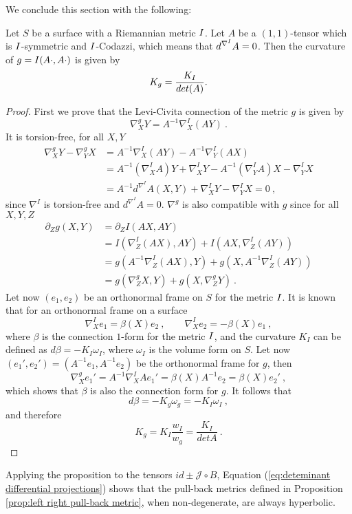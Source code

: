 We conclude this section with the following:

\begin{proposition} \label{prop:Gaussian curvature}
    Let $S$ be a surface with a Riemannian metric $I$. Let $A$ be a $(1,1)$-tensor which is $I$-symmetric and $I$-Codazzi, which means that $d^{\nabla^{I}} A=0$. Then the curvature of $g= I(A \cdot, A \cdot)$ is given by
    \[
        K_g = \frac{K_I}{det(A)}.
    \]
\end{proposition}
\begin{proof}
    First we prove that the Levi-Civita connection of the metric $g$ is given by
    \[
        \nabla^g_X Y = A^{-1} \nabla^I_X(AY) \ .
    \]
    It is torsion-free, for all $X,Y$
    \[
    \begin{split}
        \nabla^g_X Y - \nabla^g_Y X & =  A^{-1} \nabla^I_X(AY) - A^{-1} \nabla^I_Y(AX) \\
        & = A^{-1} (\nabla^I_XA)Y + \nabla^I_X Y - A^{-1} (\nabla^I_YA)X - \nabla^I_Y X  \\
        & = A^{-1} d^{\nabla^I}A(X,Y) +  \nabla^I_X Y - \nabla^I_Y X = 0 \ ,
    \end{split}
    \]
    since $\nabla^I$ is torsion-free and $d^{\nabla^I}A = 0$. $\nabla^g$ is also compatible with $g$ since for all $X,Y,Z$
    \[
    \begin{split}
        \partial_Z g(X,Y) & = \partial_Z I(AX,AY) \\
        & = I(\nabla^I_Z(AX),AY) + I(AX,\nabla^I_Z(AY)) \\
        & = g(A^{-1}\nabla^I_Z(AX),Y) + g(X,A^{-1}\nabla^I_Z(AY)) \\
        & = g(\nabla^g_Z X,Y) + g(X, \nabla^g_Z Y) \ .
    \end{split}
    \]
    Let now $(e_1, e_2)$ be an orthonormal frame on $S$ for the metric $I$. It is known that for an orthonormal frame on a surface
    \[
        \nabla^I_X e_1 = \beta(X)e_2 \ , \qquad \nabla^I_X e_2 = -\beta(X)e_1 \ ,
    \]
    where $\beta$ is the connection $1$-form for the metric $I$, and the curvature $K_I$ can be defined as $d\beta = -K_I \omega_I$, where $\omega_I$ is the volume form on $S$. Let now $(e_1', e_2') = (A^{-1} e_1, A^{-1} e_2)$ be the orthonormal frame for $g$, then
    \[
        \nabla^g_X e_1' = A^{-1} \nabla^I_X Ae_1' = \beta(X) A^{-1} e_2 = \beta(X) e_2' \ ,
    \]
    which shows that $\beta$ is also the connection form for $g$. It follows that 
    \[
        d\beta = - K_g \omega_g = - K_I \omega_I \ ,
    \]
    and therefore
    \[
        K_g = K_I \frac{w_I}{w_g} = \frac{K_I}{det A} \ .
    \]
\end{proof}
Applying the proposition to the tensors $id \pm \mathcal{J} \circ B$, Equation (\ref{eq:deteminant differential projections}) shows that the pull-back metrics defined in Proposition \ref{prop:left right pull-back metric}, when non-degenerate, are always hyperbolic.
